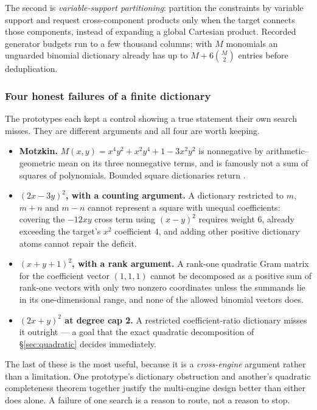 The second is \emph{variable-support partitioning}: partition the constraints by
variable support and request cross-component products only when the target
connects those components, instead of expanding a global Cartesian product.
Recorded generator budgets run to a few thousand columns; with $M$ monomials an
unguarded binomial dictionary already has up to $M+6\binom{M}{2}$ entries before
deduplication.

\subsubsection*{Four honest failures of a finite dictionary}

The prototypes each kept a control showing a true statement their own search
misses. They are different arguments and all four are worth keeping.

\begin{itemize}[leftmargin=1.4em]
\item \textbf{Motzkin.} $M(x,y)=x^4y^2+x^2y^4+1-3x^2y^2$ is nonnegative by
  arithmetic--geometric mean on its three nonnegative terms, and is famously not
  a sum of squares of polynomials. Bounded square dictionaries return \unknown{}.
\item \textbf{$(2x-3y)^2$, with a counting argument.} A dictionary restricted to
  $m$, $m+n$ and $m-n$ cannot represent a square with unequal coefficients:
  covering the $-12xy$ cross term using $(x-y)^2$ requires weight $6$, already
  exceeding the target's $x^2$ coefficient $4$, and adding other positive
  dictionary atoms cannot repair the deficit.
\item \textbf{$(x+y+1)^2$, with a rank argument.} A rank-one quadratic Gram
  matrix for the coefficient vector $(1,1,1)$ cannot be decomposed as a positive
  sum of rank-one vectors with only two nonzero coordinates unless the summands
  lie in its one-dimensional range, and none of the allowed binomial vectors
  does.
\item \textbf{$(2x+y)^2$ at degree cap 2.} A restricted coefficient-ratio
  dictionary misses it outright --- a goal that the exact quadratic decomposition
  of \S\ref{sec:quadratic} decides immediately.
\end{itemize}

The last of these is the most useful, because it is a \emph{cross-engine}
argument rather than a limitation. One prototype's dictionary obstruction and
another's quadratic completeness theorem together justify the multi-engine
design better than either does alone. A failure of one search is a reason to
route, not a reason to stop.

